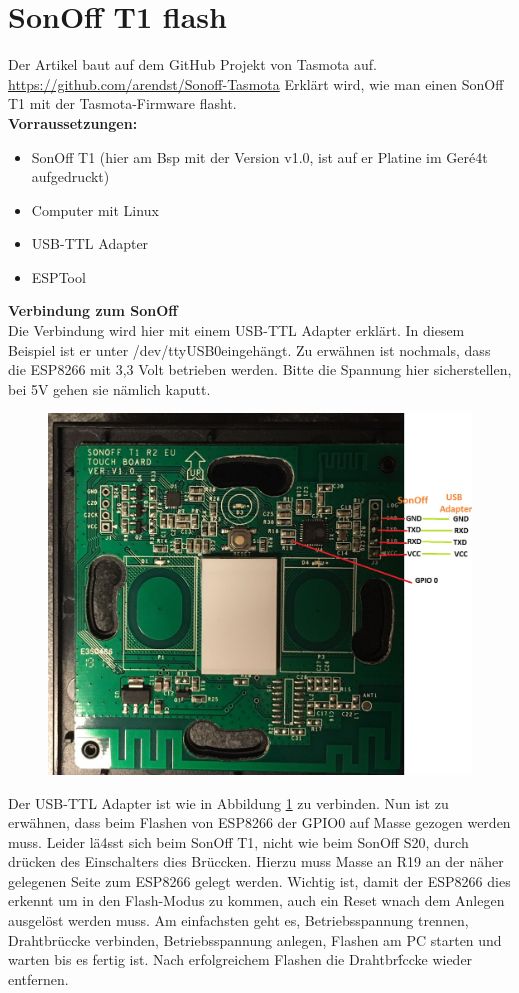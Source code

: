 \documentclass[11pt,fleqn]{book} %
\numberwithin{equation}{section} %
\numberwithin{figure}{section} %
\numberwithin{table}{section} %
\begin{document}
 \section{SonOff T1 flash}
Der Artikel baut auf dem GitHub Projekt von Tasmota auf. \url{https://github.com/arendst/Sonoff-Tasmota} Erklärt wird, wie man einen SonOff T1 mit der Tasmota-Firmware flasht.\\
\textbf{Vorraussetzungen:}
\begin{itemize}
\item SonOff T1 (hier am Bsp mit der Version v1.0, ist auf er Platine im Ger\'e4t aufgedruckt)
\item Computer mit Linux
\item USB-TTL Adapter
\item ESPTool
\end{itemize}
\textbf{Verbindung zum SonOff}\\
Die Verbindung wird hier mit einem USB-TTL Adapter erklärt. In diesem Beispiel ist er unter \glqq /dev/ttyUSB0\grqq eingehängt. Zu erwähnen ist nochmals, dass die ESP8266 mit 3,3 Volt betrieben werden. Bitte die Spannung hier sicherstellen, bei 5V gehen sie nämlich kaputt.
\begin{figure}[!h]%
\centering
\includegraphics[scale=0.23]{Pictures/sonoff_t1.jpg}
\caption{\label{pic:sonoff-t1-connect} }
\end{figure}
Der USB-TTL Adapter ist wie in Abbildung \ref{pic:sonoff-t1-connect} zu verbinden. Nun ist zu erwähnen, dass beim Flashen von ESP8266 der GPIO0 auf Masse gezogen werden muss. Leider lä4sst sich beim SonOff T1, nicht wie beim SonOff S20, durch drücken des Einschalters dies Brüccken. Hierzu muss Masse an R19 an der näher gelegenen Seite zum ESP8266 gelegt werden. Wichtig ist, damit der ESP8266 dies erkennt um in den Flash-Modus zu kommen, auch ein Reset wnach dem Anlegen ausgelöst werden muss. Am einfachsten geht es, Betriebsspannung trennen, Drahtbrüccke verbinden, Betriebsspannung anlegen, Flashen am PC starten und warten bis es fertig ist. Nach erfolgreichem Flashen die Drahtbr\'fccke wieder entfernen.\\
\end{document}
